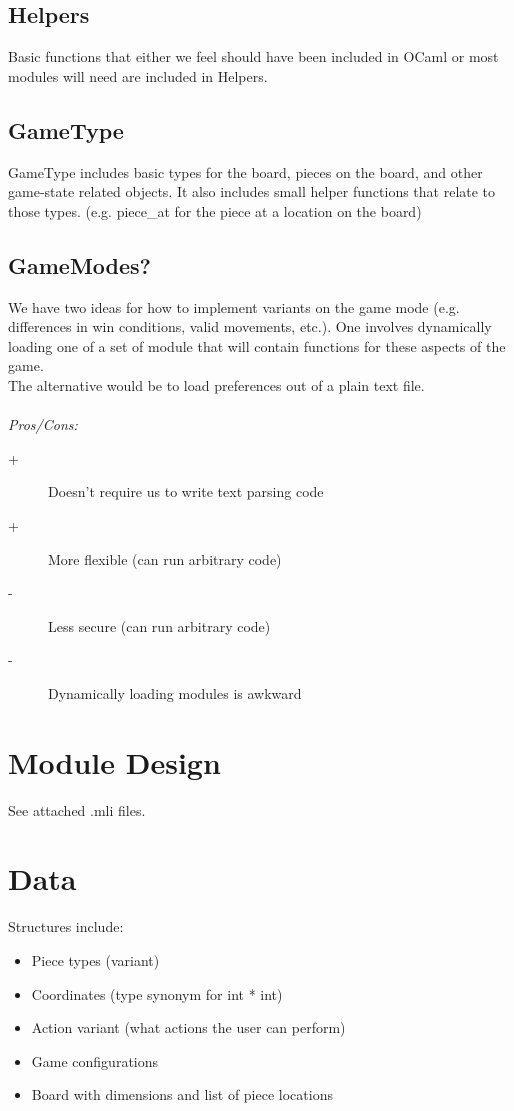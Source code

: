 \documentclass[11pt, oneside]{article}
\begin{document}
\subsection{Helpers}
Basic functions that either we feel should have been included in OCaml or most
modules will need are included in Helpers.

\subsection{GameType}
GameType includes basic types for the board, pieces on the board, and other
game-state related objects. It also includes small helper functions that relate
to those types. (e.g. piece\_at for the piece at a location on the board)

\subsection{GameModes?}
We have two ideas for how to implement variants on the game mode (e.g.
differences in win conditions, valid movements, etc.). One involves dynamically
loading one of a set of module that will contain functions for these aspects of
the game.\\
The alternative would be to load preferences out of a plain text file.\\\\
\textit{Pros/Cons:}
\begin{description}
\item[+] Doesn't require us to write text parsing code
\item[+] More flexible (can run arbitrary code)
\item[-] Less secure (can run arbitrary code)
\item[-] Dynamically loading modules is awkward
\end{description}

\section{Module Design}
See attached .mli files.

\section{Data}
Structures include:
\begin{itemize}
\item Piece types (variant)
\item Coordinates (type synonym for int * int)
\item Action variant (what actions the user can perform)
\item Game configurations
\item Board with dimensions and list of piece locations
\end{itemize}
\end{document}
